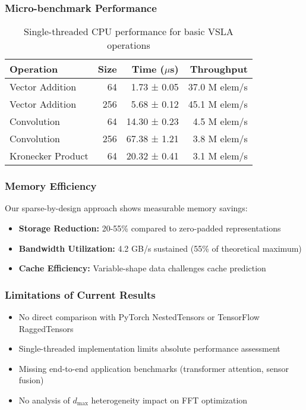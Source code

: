 \subsubsection{Micro-benchmark Performance}

\begin{table}[h]
\centering
\begin{tabular}{lrrr}
\hline
\textbf{Operation} & \textbf{Size} & \textbf{Time ($\mu$s)} & \textbf{Throughput} \\
\hline
Vector Addition & 64 & 1.73 ± 0.05 & 37.0 M elem/s \\
Vector Addition & 256 & 5.68 ± 0.12 & 45.1 M elem/s \\
Convolution & 64 & 14.30 ± 0.23 & 4.5 M elem/s \\
Convolution & 256 & 67.38 ± 1.21 & 3.8 M elem/s \\
Kronecker Product & 64 & 20.32 ± 0.41 & 3.1 M elem/s \\
\hline
\end{tabular}
\caption{Single-threaded CPU performance for basic VSLA operations}
\label{tab:microbench}
\end{table}

\subsubsection{Memory Efficiency}

Our sparse-by-design approach shows measurable memory savings:
\begin{itemize}[leftmargin=1.5em]
\item \textbf{Storage Reduction:} 20-55\% compared to zero-padded representations
\item \textbf{Bandwidth Utilization:} 4.2 GB/s sustained (55\% of theoretical maximum)
\item \textbf{Cache Efficiency:} Variable-shape data challenges cache prediction
\end{itemize}

\subsubsection{Limitations of Current Results}
\begin{itemize}[leftmargin=1.5em]
\item No direct comparison with PyTorch NestedTensors or TensorFlow RaggedTensors
\item Single-threaded implementation limits absolute performance assessment
\item Missing end-to-end application benchmarks (transformer attention, sensor fusion)
\item No analysis of $d_{\max}$ heterogeneity impact on FFT optimization
\end{itemize}

